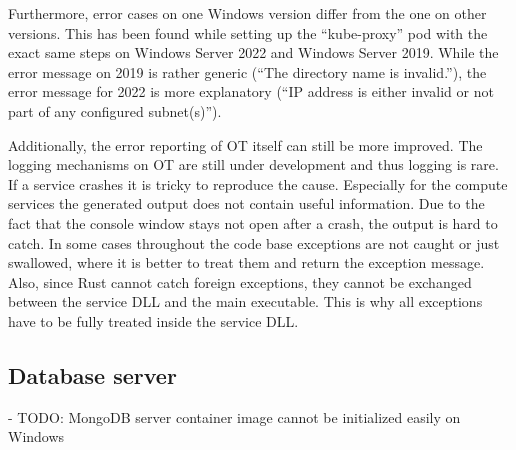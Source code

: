 Furthermore, error cases on one \ac{Windows} version differ from the one on other versions. This has been found while setting up the \enquote{kube-proxy} pod with the exact same steps on Windows Server 2022 and Windows Server 2019. While the error message on 2019 is rather generic (\enquote{The directory name is invalid.}), the error message for 2022 is more explanatory (\enquote{IP address is either invalid or not part of any configured subnet(s)}).

Additionally, the error reporting of \ac{OT} itself can still be more improved. The logging mechanisms on \ac{OT} are still under development and thus logging is rare. If a service crashes it is tricky to reproduce the cause. Especially for the compute services the generated output does not contain useful information. Due to the fact that the console window stays not open after a crash, the output is hard to catch.
In some cases throughout the code base exceptions are not caught or just swallowed, where it is better to treat them and return the exception message.
Also, since Rust cannot catch foreign exceptions, they cannot be exchanged between the service \ac{DLL} and the main executable. This is why all exceptions have to be fully treated inside the service \ac{DLL}. 


\subsection{Database server}

- TODO: MongoDB server container image cannot be initialized easily on Windows



